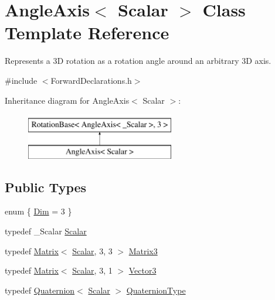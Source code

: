 \hypertarget{class_angle_axis}{\section{Angle\-Axis$<$ Scalar $>$ Class Template Reference}
\label{class_angle_axis}
}


Represents a 3\-D rotation as a rotation angle around an arbitrary 3\-D axis.  




{\ttfamily \#include $<$Forward\-Declarations.\-h$>$}

Inheritance diagram for Angle\-Axis$<$ Scalar $>$\-:\begin{figure}[H]
\begin{center}
\leavevmode
\includegraphics[height=2.000000cm]{class_angle_axis}
\end{center}
\end{figure}
\subsection*{Public Types}
\begin{DoxyCompactItemize}
\item 
enum \{ \hyperlink{class_angle_axis_ad740a3d1102022d7d0f40d2cddc349d1a1a98c7e255129f661c296373ab9c891b}{Dim} = 3
 \}
\item 
typedef \-\_\-\-Scalar \hyperlink{class_angle_axis_a6b92671c4ba67e688117dfb93215a895}{Scalar}
\item 
typedef \hyperlink{class_matrix}{Matrix}$<$ \hyperlink{class_angle_axis_a6b92671c4ba67e688117dfb93215a895}{Scalar}, 3, 3 $>$ \hyperlink{class_angle_axis_a6f1c9f87a9dccd91fc397e4e007f3668}{Matrix3}
\item 
typedef \hyperlink{class_matrix}{Matrix}$<$ \hyperlink{class_angle_axis_a6b92671c4ba67e688117dfb93215a895}{Scalar}, 3, 1 $>$ \hyperlink{class_angle_axis_a56196b7afb477e4f60bc8819cf63c6ec}{Vector3}
\item 
typedef \hyperlink{class_quaternion}{Quaternion}$<$ \hyperlink{class_angle_axis_a6b92671c4ba67e688117dfb93215a895}{Scalar} $>$ \hyperlink{class_angle_axis_af3a8449f8ac6c99fa33cac3f390e97f4}{Quaternion\-Type}
\end{DoxyCompactItemize}
